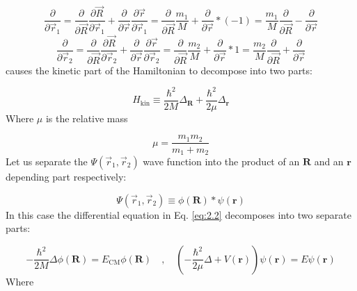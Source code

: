 \begin{equation} \label{eq:2.5}
	\frac{\partial}{\partial \vec{r}_{1}}
	=
	\frac{\partial}{\partial \vec{R}} \frac{\partial \vec{R}}{\partial \vec{r}_{1}}
	+
	\frac{\partial}{\partial \vec{r}} \frac{\partial \vec{r}}{\partial \vec{r}_{1}}
	=
	\frac{\partial}{\partial \vec{R}} \frac{m_{1}}{M}
	+
	\frac{\partial}{\partial \vec{r}} * \left( -1 \right)
	=
	\frac{m_{1}}{M} \frac{\partial}{\partial \vec{R}}
	-
	\frac{\partial}{\partial \vec{r}}
\end{equation}
\begin{equation} \label{eq:2.6}
	\frac{\partial}{\partial \vec{r}_{2}}
	=
	\frac{\partial}{\partial \vec{R}} \frac{\partial \vec{R}}{\partial \vec{r}_{2}}
	+
	\frac{\partial}{\partial \vec{r}} \frac{\partial \vec{r}}{\partial \vec{r}_{2}}
	=
	\frac{\partial}{\partial \vec{R}} \frac{m_{2}}{M}
	+
	\frac{\partial}{\partial \vec{r}} * 1
	=
	\frac{m_{2}}{M}	\frac{\partial}{\partial \vec{R}}
	+
	\frac{\partial}{\partial \vec{r}}
\end{equation}
causes the kinetic part of the Hamiltonian to decompose into two parts:

\begin{equation} \label{eq:2.7}
	\hat{H}_{\text{kin}}
	\equiv
	\frac{\hbar^{2}}{2M} \Delta_{\boldsymbol{R}} + \frac{\hbar^{2}}{2 \mu} \Delta_{\boldsymbol{r}} 
\end{equation}
Where $\mu$ is the relative mass

\begin{equation} \label{eq:2.8}
	\mu
	=
	\frac{m_{1} m_{2}}{m_{1} + m_{2}}
\end{equation}
Let us separate the $\Psi \left( \vec{r}_{1}, \vec{r}_{2} \right)$ wave function into the product of an $\boldsymbol{R}$ and an $\boldsymbol{r}$ depending part respectively:

\begin{equation} \label{eq:2.9}
	\Psi \left( \vec{r}_{1}, \vec{r}_{2} \right)
	\equiv
	\phi \left( \boldsymbol{R} \right) * \psi \left( \boldsymbol{r} \right)
\end{equation}
In this case the differential equation in Eq. \eqref{eq:2.2} decomposes into two separate parts:

\begin{equation} \label{eq:2.10}
	- \frac{\hbar^{2}}{2M} \Delta \phi \left( \boldsymbol{R} \right)
	=
	E_{\text{CM}} \phi \left( \boldsymbol{R} \right)
	\quad , \quad
	\left( - \frac{\hbar^{2}}{2 \mu} \Delta + V \left( \boldsymbol{r} \right) \right) \psi \left( \boldsymbol{r} \right)
	=
	E \psi \left( \boldsymbol{r} \right)
\end{equation}
Where

